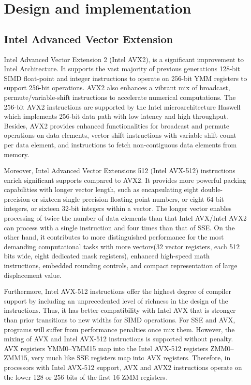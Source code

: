\documentclass[5p,times,twocolumn]{elsarticle}
\begin{document}
\section{Design and implementation}\label{sec:design}
\subsection{Intel Advanced Vector Extension}
Intel Advanced Vector Extension 2 (Intel AVX2), is a significant improvement to Intel Architecture.
It supports the vast majority of previous generations 128-bit SIMD float-point
and integer instructions to operate on 256-bit YMM registers to support 256-bit operations.
%
AVX2 also enhances a vibrant mix of broadcast, permute/variable-shift instructions to accelerate
numerical computations. The 256-bit AVX2 instructions are supported by the Intel microarchitecture
Haswell which implements 256-bit data path with low latency and high throughput.
Besides, AVX2 provides enhanced functionalities for broadcast and permute operations on data elements,
vector shift instructions with variable-shift count per data element,
and instructions to fetch non-contiguous data elements from memory.

Moreover, Intel Advanced Vector Extensions 512 (Intel AVX-512) instructions
enrich significant supports compared to AVX2. It provides more powerful packing
capabilities with longer vector length, such as encapsulating eight double-precision
or sixteen single-precision floating-point numbers,
or eight 64-bit integers, or sixteen 32-bit integers within a vector.
The longer vector enables processing of twice the number of data elements
than that Intel AVX/Intel AVX2 can
process with a single instruction and four times than that of SSE.
On the other hand, it contributes to more distinguished performance for the most
demanding computational tasks with more vectors(32 vector registers, each 512 bits wide,
eight dedicated mask registers), enhanced high-speed math instructions, embedded rounding controls,
and compact representation of large displacement value.

Furthermore, Intel AVX-512 instructions offer the highest degree of compiler
support by including an unprecedented level of richness in the design of the instructions.
Thus, it has better compatibility with Intel AVX that is stronger than
prior transitions to new widths for SIMD operations.
For SSE and AVX, programs will suffer from performance penalties once mix them.
However, the mixing of AVX and Intel AVX-512 instructions is supported without penalty.
AVX registers YMM0--YMM15 map into the Intel AVX-512 registers
ZMM0--ZMM15, very much like SSE registers map into AVX registers. Therefore, in processors with
Intel AVX-512 support, AVX and AVX2 instructions operate on the lower 128 or 256 bits of the first 16 ZMM registers.
\end{document}
